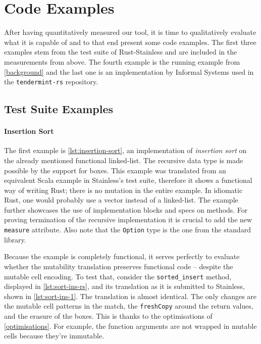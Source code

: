 


\section{Code Examples}

After having quantitatively measured our tool, it is time to qualitatively
evaluate what it is capable of and to that end present some code examples. The
first three examples stem from the test suite of Rust-Stainless and are included
in the measurements from above. The fourth example is the running example from
\autoref{background} and the last one is an implementation by Informal Systems
used in the \texttt{tendermint-rs} repository.

\subsection{Test Suite Examples}

\paragraph{Insertion Sort}

The first example is \autoref{lst:insertion-sort}, an implementation of
\emph{insertion sort} on the already mentioned functional linked-list. The
recursive data type is made possible by the support for boxes. This example was
translated from an equivalent Scala example in Stainless's test suite, therefore
it shows a functional way of writing Rust; there is no mutation in the entire
example. In idiomatic Rust, one would probably use a vector instead of a
linked-list. The example further showcases the use of implementation blocks and
specs on methods. For proving termination of the recursive implementation it is
crucial to add the new \lstinline!measure! attribute. Also note that the
\lstinline!Option! type is the one from the standard library.

Because the example is completely functional, it serves perfectly to evaluate
whether the  mutability translation preserves functional code -- despite the
mutable cell encoding. To test that, consider the \lstinline!sorted_insert!
method, displayed in \autoref{lst:sort-ins-rs}, and its translation as it is
submitted to Stainless, shown in \autoref{lst:sort-ins-1}. The translation is
almost identical. The only changes are the mutable cell patterns in the match,
the \lstinline!freshCopy! around the return values, and the erasure of the
boxes. This is thanks to the optimisations of \autoref{optimisations}. For
example, the function arguments are not wrapped in mutable cells because they're
immutable.

